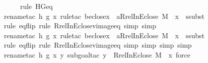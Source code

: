 \begin{isabellebody}
\ \ \ \ \isamarkupfalse%
{\isacharparenleft}{\kern0pt}rule\ HGeq{\isacharparenright}{\kern0pt}\isanewline
\ \ \ \ \ \ \ \ \isamarkupfalse%
{\isacharparenleft}{\kern0pt}rename{\isacharunderscore}{\kern0pt}tac\ h\ g\ x{\isacharcomma}{\kern0pt}\ rule{\isacharunderscore}{\kern0pt}tac\ b{\isacharequal}{\kern0pt}{\isachardoublequoteopen}eclose{\isacharparenleft}{\kern0pt}x{\isacharparenright}{\kern0pt}{\isachardoublequoteclose}\ \ a{\isacharequal}{\kern0pt}{\isachardoublequoteopen}Rrel{\isacharparenleft}{\kern0pt}InEclose{\isacharcomma}{\kern0pt}\ M{\isacharparenright}{\kern0pt}\ {\isacharminus}{\kern0pt}{\isacharbackquote}{\kern0pt}{\isacharbackquote}{\kern0pt}\ {\isacharbraceleft}{\kern0pt}x{\isacharbraceright}{\kern0pt}{\isachardoublequoteclose}\ \ ssubst{\isacharparenright}{\kern0pt}\isanewline
\ \ \ \ \ \ \ \ \ \ \isamarkupfalse%
{\isacharparenleft}{\kern0pt}rule\ eq{\isacharunderscore}{\kern0pt}flip{\isacharcomma}{\kern0pt}\ rule\ Rrel{\isacharunderscore}{\kern0pt}InEclose{\isacharunderscore}{\kern0pt}vimage{\isacharunderscore}{\kern0pt}eq{\isacharcomma}{\kern0pt}\ simp{\isacharcomma}{\kern0pt}\ simp{\isacharparenright}{\kern0pt}\isanewline
\ \ \ \ \ \ \ \ \isamarkupfalse%
{\isacharparenleft}{\kern0pt}rename{\isacharunderscore}{\kern0pt}tac\ h\ g\ x{\isacharcomma}{\kern0pt}\ rule{\isacharunderscore}{\kern0pt}tac\ b{\isacharequal}{\kern0pt}{\isachardoublequoteopen}eclose{\isacharparenleft}{\kern0pt}x{\isacharparenright}{\kern0pt}{\isachardoublequoteclose}\ \ a{\isacharequal}{\kern0pt}{\isachardoublequoteopen}Rrel{\isacharparenleft}{\kern0pt}InEclose{\isacharcomma}{\kern0pt}\ M{\isacharparenright}{\kern0pt}\ {\isacharminus}{\kern0pt}{\isacharbackquote}{\kern0pt}{\isacharbackquote}{\kern0pt}\ {\isacharbraceleft}{\kern0pt}x{\isacharbraceright}{\kern0pt}{\isachardoublequoteclose}\ \ ssubst{\isacharparenright}{\kern0pt}\isanewline
\ \ \ \ \ \ \ \ \ \ \isamarkupfalse%
{\isacharparenleft}{\kern0pt}rule\ eq{\isacharunderscore}{\kern0pt}flip{\isacharcomma}{\kern0pt}\ rule\ Rrel{\isacharunderscore}{\kern0pt}InEclose{\isacharunderscore}{\kern0pt}vimage{\isacharunderscore}{\kern0pt}eq{\isacharcomma}{\kern0pt}\ simp{\isacharcomma}{\kern0pt}\ simp{\isacharcomma}{\kern0pt}\ simp{\isacharcomma}{\kern0pt}\ simp{\isacharparenright}{\kern0pt}\isanewline
\ \ \ \ \isamarkupfalse%
{\isacharparenleft}{\kern0pt}rename{\isacharunderscore}{\kern0pt}tac\ h\ g\ x\ y{\isacharcomma}{\kern0pt}\ subgoal{\isacharunderscore}{\kern0pt}tac\ {\isachardoublequoteopen}y\ {\isasymin}\ Rrel{\isacharparenleft}{\kern0pt}InEclose{\isacharcomma}{\kern0pt}\ M{\isacharparenright}{\kern0pt}\ {\isacharminus}{\kern0pt}{\isacharbackquote}{\kern0pt}{\isacharbackquote}{\kern0pt}\ {\isacharbraceleft}{\kern0pt}x{\isacharbraceright}{\kern0pt}{\isachardoublequoteclose}{\isacharcomma}{\kern0pt}\ force{\isacharparenright}{\kern0pt}\isanewline

\end{isabellebody}
